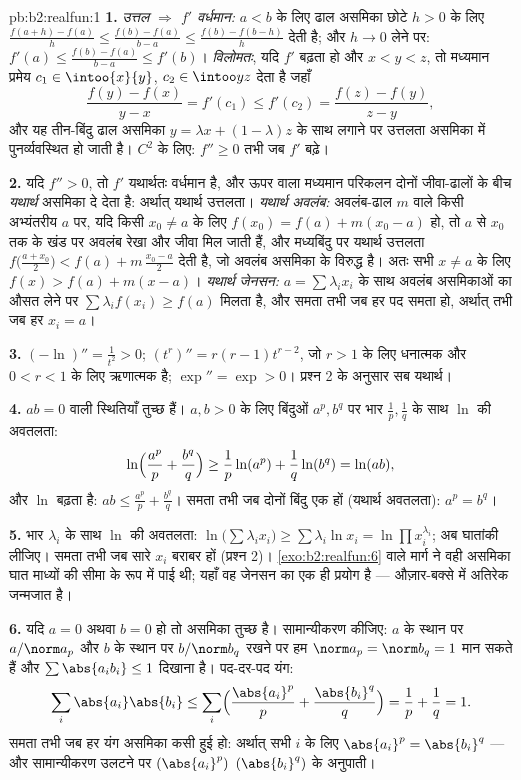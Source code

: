 \begin{solution}{pb:b2:realfun:1}
\textbf{1.} \emph{उत्तल $\Rightarrow$ $f'$ वर्धमान:} $a <
b$ के लिए ढाल असमिका छोटे $h > 0$
के लिए $\frac{f(a+h)
- f(a)}h \leq \frac{f(b) - f(a)}{b-a} \leq \frac{f(b) -
f(b-h)}{h}$ देती है; और $h \to 0$ लेने पर: $f'(a) \leq \frac{f(b) -
f(a)}{b - a} \leq f'(b)$। \emph{विलोमतः}, यदि $f'$ बढ़ता
हो और $x < y < z$, तो मध्यमान प्रमेय $c_1 \in
\intoo{x}{y}$, $c_2 \in \intoo yz$ देता है जहाँ
\[
\frac{f(y) - f(x)}{y - x} = f'(c_1) \leq f'(c_2)
= \frac{f(z) - f(y)}{z - y},
\]
और यह तीन-बिंदु ढाल असमिका $y = \lambda
x + (1 - \lambda)z$ के साथ लगाने पर उत्तलता असमिका में
पुनर्व्यवस्थित हो जाती है। $C^2$ के लिए: $f'' \geq 0$ तभी जब $f'$ बढ़े।

\textbf{2.} यदि $f'' > 0$, तो $f'$ यथार्थतः वर्धमान है, और ऊपर वाला मध्यमान
परिकलन दोनों जीवा-ढालों के बीच \emph{यथार्थ} असमिका दे देता है: अर्थात्
यथार्थ उत्तलता। \emph{यथार्थ अवलंब:} अवलंब-ढाल $m$ वाले किसी अभ्यंतरीय
$a$ पर, यदि किसी $x_0 \neq a$ के लिए $f(x_0) =
f(a) + m(x_0 - a)$ हो, तो $a$ से $x_0$ तक के खंड पर अवलंब
रेखा और जीवा मिल जाती हैं, और मध्यबिंदु पर यथार्थ उत्तलता $f\bigl(\frac{a +
x_0}2\bigr) < f(a) + m\,\frac{x_0 - a}2$ देती है,
जो अवलंब असमिका के विरुद्ध है। अतः सभी $x \neq
a$ के लिए $f(x) > f(a) + m(x - a)$। \emph{यथार्थ
जेनसन:} $a = \sum\lambda_ix_i$ के साथ अवलंब असमिकाओं का औसत लेने पर $\sum\lambda_if(x_i) \geq f(a)$ मिलता है, और समता
तभी जब हर पद समता हो, अर्थात् तभी जब हर $x_i
= a$।

\textbf{3.} $(-\ln)'' = \frac1{t^2} > 0$; $(t^r)'' = r(r -
1)t^{r-2}$, जो $r > 1$ के लिए धनात्मक और $0 < r < 1$ के लिए ऋणात्मक है;
$\exp'' = \exp > 0$। प्रश्न 2 के अनुसार सब यथार्थ।

\textbf{4.} $ab = 0$ वाली स्थितियाँ तुच्छ हैं। $a, b > 0$ के लिए बिंदुओं $a^p, b^q$ पर भार
$\frac1p, \frac1q$ के साथ $\ln$ की अवतलता:
\[
\ln\Bigl(\frac{a^p}p + \frac{b^q}q\Bigr) \geq
\frac1p\ln(a^p) + \frac1q\ln(b^q) = \ln(ab),
\]
और $\ln$ बढ़ता है: $ab \leq \frac{a^p}p + \frac{b^q}q$। समता तभी जब दोनों बिंदु एक हों (यथार्थ अवतलता):
$a^p =
b^q$।

\textbf{5.} भार $\lambda_i$ के साथ $\ln$ की अवतलता: $\ln\bigl(\sum\lambda_ix_i\bigr) \geq \sum\lambda_i\ln x_i =
\ln\prod x_i^{\lambda_i}$; अब घातांकी लीजिए। समता
तभी जब सारे $x_i$ बराबर हों (प्रश्न 2)। \cref{exo:b2:realfun:6} वाले मार्ग ने वही असमिका घात
माध्यों की सीमा के रूप में पाई थी; यहाँ वह जेनसन का एक ही प्रयोग है ---
औज़ार-बक्से में अतिरेक जन्मजात है।

\textbf{6.} यदि $a = 0$ अथवा $b = 0$ हो तो असमिका तुच्छ है। सामान्यीकरण कीजिए:
$a$ के स्थान पर $a/\norm a_p$ और $b$ के स्थान पर $b/\norm
b_q$ रखने पर हम $\norm a_p = \norm b_q = 1$ मान सकते हैं
और $\sum\abs{a_ib_i} \leq 1$ दिखाना है। पद-दर-पद यंग:
\[
\sum_i\abs{a_i}\abs{b_i} \leq
\sum_i\Bigl(\frac{\abs{a_i}^p}{p} +
\frac{\abs{b_i}^q}{q}\Bigr) = \frac1p + \frac1q = 1 .
\]
समता तभी जब हर यंग असमिका कसी हुई हो: अर्थात् सभी $i$ के लिए $\abs{a_i}^p =
\abs{b_i}^q$ ---
और सामान्यीकरण उलटने पर $(\abs{a_i}^p)$ $(\abs{b_i}^q)$ के अनुपाती।


\end{solution}

